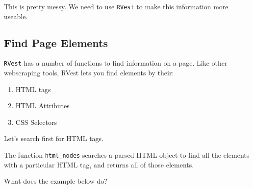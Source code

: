 \documentclass[]{book}
\providecommand{\tightlist}{%
  \setlength{\itemsep}{0pt}\setlength{\parskip}{0pt}}
\begin{document}
This is pretty messy. We need to use \texttt{RVest} to make this information more useable.

\hypertarget{find-page-elements}{%
\subsection{Find Page Elements}\label{find-page-elements}}

\texttt{RVest} has a number of functions to find information on a page. Like other webscraping tools, RVest lets you find elements by their:

\begin{enumerate}
\def\labelenumi{\arabic{enumi}.}
\tightlist
\item
  HTML tags
\item
  HTML Attributes
\item
  CSS Selectors
\end{enumerate}

Let's search first for HTML tags.

The function \texttt{html\_nodes} searches a parsed HTML object to find all the elements with a particular HTML tag, and returns all of those elements.

What does the example below do?
\end{document}
